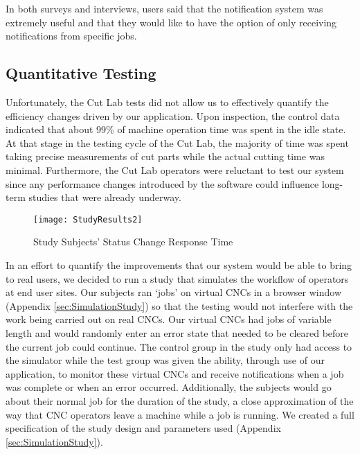 \documentclass[12pt,letterpaper,titlepage]{article}
\begin{document}
In both surveys and interviews, users said that the notification system was extremely useful and that they would like to have the option of only receiving notifications from specific jobs.

\subsection{Quantitative Testing} \label{sec:QuantitativeTesting}

Unfortunately, the Cut Lab tests did not allow us to effectively quantify the efficiency changes driven by our application. Upon inspection, the control data indicated that about 99\% of machine operation time was spent in the idle state. At that stage in the testing cycle of the Cut Lab, the majority of time was spent taking precise measurements of cut parts while the actual cutting time was minimal. Furthermore, the Cut Lab operators were reluctant to test our system since any performance changes introduced by the software could influence long-term studies that were already underway.

\begin{wrapfigure}{r}{0.65\textwidth}
  \begin{centering}
    \vspace{-20pt}
    \texttt{[image: StudyResults2]}
    \vspace{-25pt}
    \caption{Study Subjects' Status Change Response Time}
    \label{fig:StudyResults}
  \end{centering}
  \vspace{-20pt}
\end{wrapfigure}

In an effort to quantify the improvements that our system would be able to bring to real users, we decided to run a study that simulates the workflow of operators at end user sites. Our subjects ran ‘jobs’ on virtual CNCs in a browser window (Appendix \ref{sec:SimulationStudy}) so that the testing would not interfere with the work being carried out on real CNCs. Our virtual CNCs had jobs of variable length and would randomly enter an error state that needed to be cleared before the current job could continue. The control group in the study only had access to the simulator while the test group was given the ability, through use of our application, to monitor these virtual CNCs and receive notifications when a job was complete or when an error occurred. Additionally, the subjects would go about their normal job for the duration of the study, a close approximation of the way that CNC operators leave a machine while a job is running. We created a full specification of the study design and parameters used (Appendix \ref{sec:SimulationStudy}).
\end{document}

